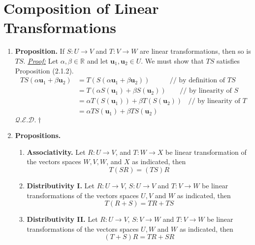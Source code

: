 \documentclass[oneside, 12pt]{book}
\newcommand{\settag}[1]{\renewcommand{\theenumi}{#1}}
\newcommand{\R}{\mathbb{R}}
\newcommand{\qed}{\hfill $\mathcal{Q}.\mathcal{E}.\mathcal{D}.\dagger$}
\newcommand{\tbf}[1]{\textbf{#1}}
\newcommand{\tit}[1]{\textit{#1}}
\newcommand{\proof}{\tit{\underline{Proof:}}} %
\newcommand{\trans}[3]{$#1:#2\rightarrow{}#3$}
\newcommand{\para}[1]{\item \tbf{#1}}
\newcommand{\vu}{\mathbf{u}}
\begin{document}
\section{Composition of Linear Transformations}
\begin{enumerate}
    \settag{2.5.1}
    \para{Proposition.} If \trans{S}{U}{V} and \trans{T}{V}{W} are linear transformations, then so is $TS$. \newline
    \proof \newline
    Let $\alpha ,\beta \in \R$ and let $\vu_1,\vu_2 \in U$. We must show that $TS$ satisfies Proposition (2.1.2).
    \begin{align*}
        TS(\alpha \vu_1 + \beta \vu_2) &= T(S(\alpha \vu_1 + \beta \vu_2)) ~~~~~~~~~~~~~\text{// by definition of $TS$}\\
        &= T(\alpha S(\vu_1) + \beta S(\vu_2))~~~~~~~~~\text{// by linearity of $S$}  \\
        &= \alpha T(S(\vu_1)) + \beta T(S(\vu_2))~~~~\text{// by linearity of $T$} \\
        &= \alpha TS(\vu_1) + \beta TS(\vu_2)
    \end{align*}
    \qed
    
    \settag{2.5.4}
    \para{Propositions.} 
    \begin{enumerate}
        \item \textbf{Associativity.} Let \trans{R}{U}{V}, and \trans{T}{W}{X} be linear transformation of the vectors spaces $W,V,W$, and $X$ as indicated, then 
        \begin{equation*}
            T(SR) = (TS)R
        \end{equation*}
        \item \textbf{Distributivity I.} Let \trans{R}{U}{V}, \trans{S}{U}{V} and \trans{T}{V}{W} be linear transformations of the vectors spaces $U,V$ and $W$ as indicated, then
        \begin{equation*}
            T(R+S) = TR+ TS
        \end{equation*}
        \item \textbf{Distributivity II.} Let \trans{R}{U}{V}, \trans{S}{V}{W} and \trans{T}{V}{W} be linear transformations of the vectors spaces $U, W$ and $W$ as indicated, then
        \begin{equation*}
            (T+S)R = TR + SR
        \end{equation*}
    \end{enumerate}
    

\end{enumerate}
\end{document}
